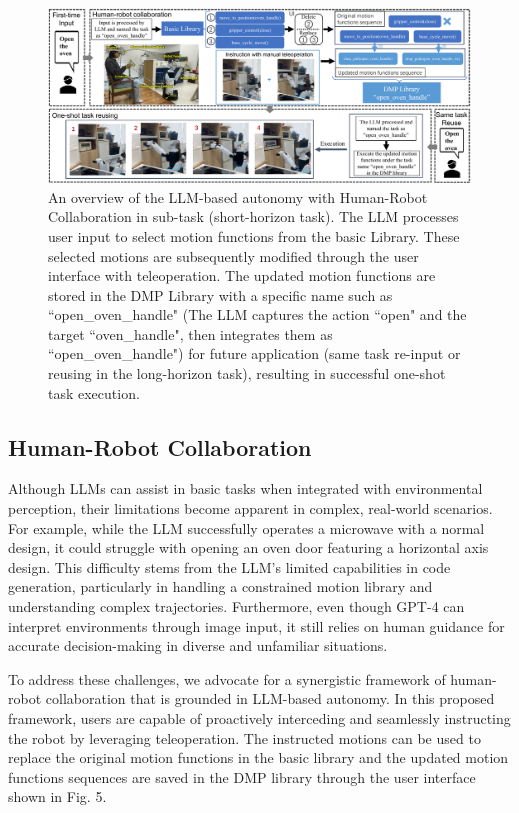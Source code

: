 \documentclass[letterpaper,conference]{ieeeconf}
\begin{document}
 \begin{figure}[t]
 \vspace{1.3mm}
    \centering
    \includegraphics[width=0.9\linewidth]{HRC_v3.pdf}
    \vspace{-3mm}
    \caption{An overview of the LLM-based autonomy with Human-Robot Collaboration in sub-task (short-horizon task). The LLM processes user input to select motion functions from the basic Library. These selected motions are subsequently modified through the user interface with teleoperation. The updated motion functions are stored in the DMP Library with a specific name such as ``open\_oven\_handle" (The LLM captures the action ``open" and the target ``oven\_handle", then integrates them as ``open\_oven\_handle") for future application (same task re-input or reusing in the long-horizon task), resulting in successful one-shot task execution.}
    \label{fig:hrc}
  \vspace{-5mm}
\end{figure}
\subsection{Human-Robot Collaboration}
Although LLMs can assist in basic tasks when integrated with environmental perception, their limitations become apparent in complex, real-world scenarios. For example, while the LLM successfully operates a microwave with a normal design, it could struggle with opening an oven door featuring a horizontal axis design. This difficulty stems from the LLM's limited capabilities in code generation, particularly in handling a constrained motion library and understanding complex trajectories. Furthermore, even though GPT-4 can interpret environments through image input, it still relies on human guidance for accurate decision-making in diverse and unfamiliar situations.

To address these challenges, we advocate for a synergistic framework of human-robot collaboration that is grounded in LLM-based autonomy. In this proposed framework, users are capable of proactively interceding and seamlessly instructing the robot by leveraging teleoperation. The instructed motions can be used to replace the original motion functions in the basic library and the updated motion functions sequences are saved in the DMP library through the user interface shown in Fig. 5.
\end{document}
